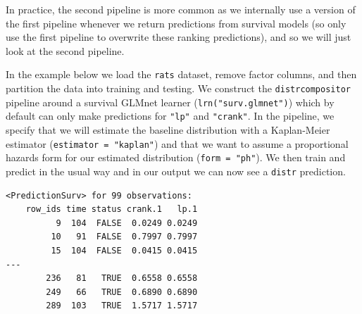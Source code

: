 In practice, the second pipeline is more common as we internally use a
version of the first pipeline whenever we return predictions from
survival models (so only use the first pipeline to overwrite these
ranking predictions), and so we will just look at the second pipeline.

In the example below we load the \texttt{rats} dataset, remove factor
columns, and then partition the data into training and testing. We
construct the \texttt{distrcompositor} pipeline around a survival GLMnet
learner (\texttt{lrn("surv.glmnet")}) which by default can only make
predictions for \texttt{"lp"} and \texttt{"crank"}. In the pipeline, we
specify that we will estimate the baseline distribution with a
Kaplan-Meier estimator
(\texttt{estimator\ =\ "kaplan"}) and that we want to assume a
proportional hazards form for our estimated distribution
(\texttt{form\ =\ "ph"}). We then train and predict in the usual way and
in our output we can now see a \texttt{distr} prediction.

\begin{Shaded}
\begin{Highlighting}[]

\OtherTok{=} \NormalTok{(}\NormalTok{)}\SpecialCharTok{$}\NormalTok{(}\NormalTok{(}\NormalTok{, }\NormalTok{))}
\OtherTok{=} 

\OtherTok{=} \NormalTok{(}\NormalTok{)}

\SpecialCharTok{$}\SpecialCharTok{$}\SpecialCharTok{$}\SpecialCharTok{$}
\end{Highlighting}
\end{Shaded}

\begin{verbatim}
<PredictionSurv> for 99 observations:
    row_ids time status crank.1   lp.1
          9  104  FALSE  0.0249 0.0249
         10   91  FALSE  0.7997 0.7997
         15  104  FALSE  0.0415 0.0415
---                                   
        236   81   TRUE  0.6558 0.6558
        249   66   TRUE  0.6890 0.6890
        289  103   TRUE  1.5717 1.5717
\end{verbatim}

